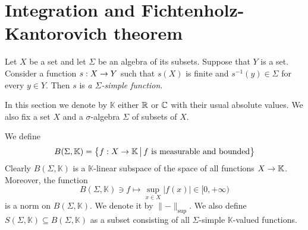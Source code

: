 \section{Integration and Fichtenholz-Kantorovich theorem}

\begin{definition}
    Let $X$ be a set and let $\Sigma$ be an algebra of its subsets. Suppose that $Y$ is a set. Consider a function $s:X\rightarrow Y$ such that $s(X)$ is finite and $s^{-1}(y) \in \Sigma$ for every $y \in Y$. Then $s$ is \textit{a $\Sigma$-simple function}.
\end{definition}
\noindent
In this section we denote by $\mathbb{K}$ either ${\mathbb R}$ or ${\mathbb C}$ with their usual absolute values. We also fix a set $X$ and a $\sigma$-algebra $\Sigma$ of subsets of $X$.

We define
$$B(\Sigma,\mathbb{K}) = \big\{f:X\rightarrow \mathbb{K}\,\big|\,f\mbox{ is measurable and bounded}\big\}$$
Clearly $B(\Sigma, \mathbb{K})$ is a $\mathbb{K}$-linear subspace of the space of all functions $X\rightarrow \mathbb{K}$. Moreover, the function
$$B(\Sigma,\mathbb{K}) \ni f \mapsto \sup_{x\in X}|f(x)|\in [0,+\infty)$$
is a norm on $B(\Sigma, \mathbb{K})$. We denote it by $\lVert-\rVert_{\sup}$. We also define $S(\Sigma,\mathbb{K})\subseteq B(\Sigma,\mathbb{K})$ as a subset consisting of all $\Sigma$-simple $\mathbb{K}$-valued functions.

